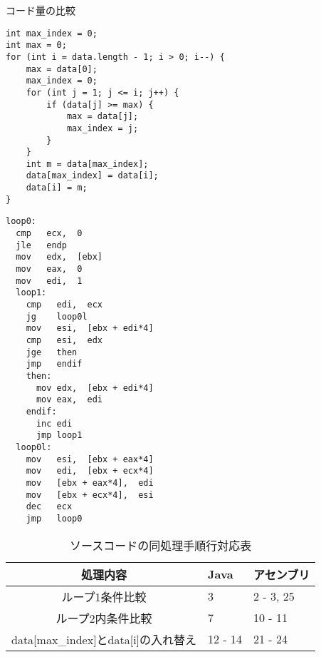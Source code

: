 \begin{table}[h]
  \caption{コード量の比較}
  \label{fig:ソースコード}
\begin{minipage}[t]{0.6\linewidth}
  \begin{lstlisting}[caption={Java言語での記述例}]
int max_index = 0;
int max = 0;
for (int i = data.length - 1; i > 0; i--) {
    max = data[0];
    max_index = 0;
    for (int j = 1; j <= i; j++) {
        if (data[j] >= max) {
            max = data[j];
            max_index = j;
        }
    }
    int m = data[max_index];
    data[max_index] = data[i];
    data[i] = m;
}
  \end{lstlisting}
\end{minipage}
\begin{minipage}[t]{0.4\linewidth}
  \begin{lstlisting}[caption={アセンブリ言語での記述例}]
loop0:
  cmp   ecx,  0  
  jle   endp
  mov   edx,  [ebx]   
  mov   eax,  0       
  mov   edi,  1
  loop1:
    cmp   edi,  ecx   
    jg    loop0l
    mov   esi,  [ebx + edi*4] 
    cmp   esi,  edx       
    jge   then
    jmp   endif
    then:
      mov edx,  [ebx + edi*4] 
      mov eax,  edi           
    endif:
      inc edi
      jmp loop1
  loop0l:
    mov   esi,  [ebx + eax*4]   
    mov   edi,  [ebx + ecx*4]  
    mov   [ebx + eax*4],  edi  
    mov   [ebx + ecx*4],  esi 
    dec   ecx
    jmp   loop0
  \end{lstlisting}
\end{minipage}
\end{table}
\begin{table}[h]
  \caption{ソースコードの同処理手順行対応表}
  \label{tab:対応表}
  \centering
  \begin{tabular}{cll}
    処理内容 & Java & アセンブリ\\ \hline
    ループ1条件比較 & 3 & 2 - 3, 25\\
    ループ2内条件比較 & 7 & 10 - 11\\
    data[max\_index]とdata[i]の入れ替え & 12 - 14 & 21 - 24\\ \hline
  \end{tabular}
\end{table}

